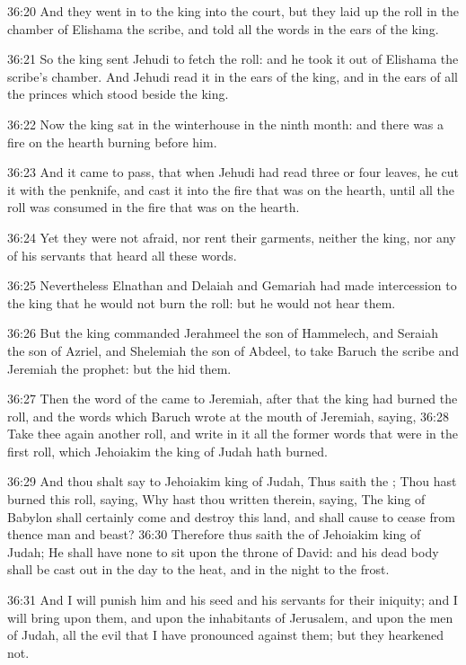 36:20 And they went in to the king into the court, but they laid up the roll in the chamber of Elishama the scribe, and told all the words in the ears of the king.

36:21 So the king sent Jehudi to fetch the roll: and he took it out of Elishama the scribe's chamber. And Jehudi read it in the ears of the king, and in the ears of all the princes which stood beside the king.

36:22 Now the king sat in the winterhouse in the ninth month: and there was a fire on the hearth burning before him.

36:23 And it came to pass, that when Jehudi had read three or four leaves, he cut it with the penknife, and cast it into the fire that was on the hearth, until all the roll was consumed in the fire that was on the hearth.

36:24 Yet they were not afraid, nor rent their garments, neither the king, nor any of his servants that heard all these words.

36:25 Nevertheless Elnathan and Delaiah and Gemariah had made intercession to the king that he would not burn the roll: but he would not hear them.

36:26 But the king commanded Jerahmeel the son of Hammelech, and Seraiah the son of Azriel, and Shelemiah the son of Abdeel, to take Baruch the scribe and Jeremiah the prophet: but the \LORD hid them.

36:27 Then the word of the \LORD came to Jeremiah, after that the king had burned the roll, and the words which Baruch wrote at the mouth of Jeremiah, saying, 36:28 Take thee again another roll, and write in it all the former words that were in the first roll, which Jehoiakim the king of Judah hath burned.

36:29 And thou shalt say to Jehoiakim king of Judah, Thus saith the \LORD; Thou hast burned this roll, saying, Why hast thou written therein, saying, The king of Babylon shall certainly come and destroy this land, and shall cause to cease from thence man and beast?  36:30 Therefore thus saith the \LORD of Jehoiakim king of Judah; He shall have none to sit upon the throne of David: and his dead body shall be cast out in the day to the heat, and in the night to the frost.

36:31 And I will punish him and his seed and his servants for their iniquity; and I will bring upon them, and upon the inhabitants of Jerusalem, and upon the men of Judah, all the evil that I have pronounced against them; but they hearkened not.

